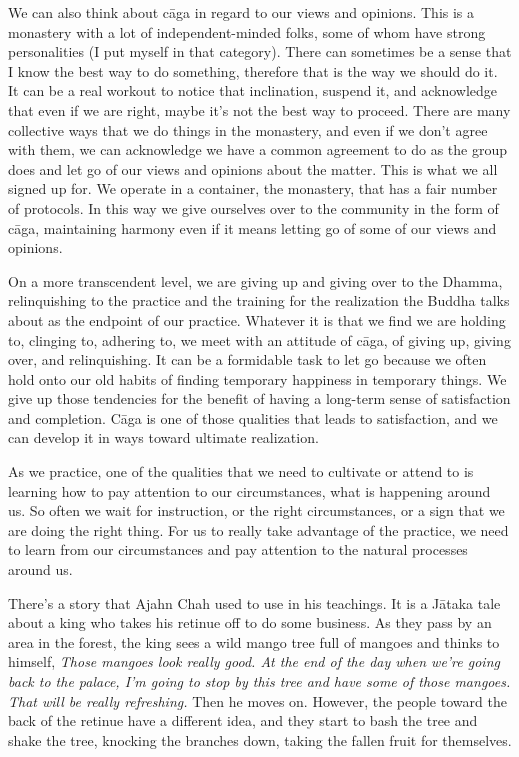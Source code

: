 We can also think about cāga in regard to our views and opinions. This 
is a monastery with a lot of independent-minded folks, some of whom 
have strong personalities (I put myself in that category). There can 
sometimes be a sense that I know the best way to do something, 
therefore that is the way we should do it. It can be a real workout to 
notice that inclination, suspend it, and acknowledge that even if we 
are right, maybe it's not the best way to proceed. There are many 
collective ways that we do things in the monastery, and even if we 
don't agree with them, we can acknowledge we have a common agreement to 
do as the group does and let go of our views and opinions about the 
matter. This is what we all signed up for. We operate in a container, 
the monastery, that has a fair number of protocols. In this way we give 
ourselves over to the community in the form of cāga, maintaining 
harmony even if it means letting go of some of our views and opinions.

On a more transcendent level, we are giving up and giving over to the 
Dhamma, relinquishing to the practice and the training for the 
realization the Buddha talks about as the endpoint of our practice. 
Whatever it is that we find we are holding to, clinging to, adhering 
to, we meet with an attitude of cāga, of giving up, giving over, and 
relinquishing. It can be a formidable task to let go because we often 
hold onto our old habits of finding temporary happiness in temporary 
things. We give up those tendencies for the benefit of having a 
long-term sense of satisfaction and completion. Cāga is one of those 
qualities that leads to satisfaction, and we can develop it in ways 
toward ultimate realization.


As we practice, one of the qualities that we need to cultivate or 
attend to is learning how to pay attention to our circumstances, what 
is happening around us. So often we wait for instruction, or the right 
circumstances, or a sign that we are doing the right thing. For us to 
really take advantage of the practice, we need to learn from our 
circumstances and pay attention to the natural processes around us.

There's a story that Ajahn Chah used to use in his teachings. It is a 
Jātaka tale about a king who takes his retinue off to do some 
business. As they pass by an area in the forest, the king sees a wild 
mango tree full of mangoes and thinks to himself, \emph{Those mangoes 
look really good. At the end of the day when we're going back to the 
palace, I'm going to stop by this tree and have some of those mangoes. 
That will be really refreshing.} Then he moves on. However, the people 
toward the back of the retinue have a different idea, and they start to 
bash the tree and shake the tree, knocking the branches down, taking 
the fallen fruit for themselves.

